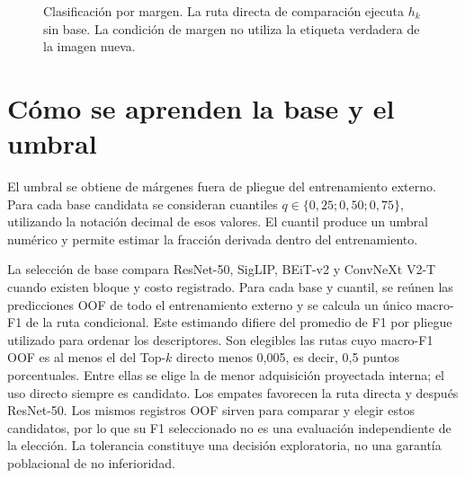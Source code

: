 \begin{figure}[!htbp]\centering
{}
\caption{Clasificación por margen. La ruta directa de comparación ejecuta \(h_k\) sin base. La condición de margen no utiliza la etiqueta verdadera de la imagen nueva.}
\label{fig:tk-inference}
\end{figure}

\section{Cómo se aprenden la base y el umbral}
El umbral se obtiene de márgenes fuera de pliegue del entrenamiento externo. Para cada base candidata se consideran cuantiles \(q\in\{0,25;0,50;0,75\}\), utilizando la notación decimal de esos valores. El cuantil produce un umbral numérico y permite estimar la fracción derivada dentro del entrenamiento.

La selección de base compara ResNet-50, SigLIP, BEiT-v2 y ConvNeXt V2-T cuando existen bloque y costo registrado. Para cada base y cuantil, se reúnen las predicciones OOF de todo el entrenamiento externo y se calcula un único macro-F1 de la ruta condicional. Este estimando difiere del promedio de F1 por pliegue utilizado para ordenar los descriptores. Son elegibles las rutas cuyo macro-F1 OOF es al menos el del Top-\(k\) directo menos 0,005, es decir, 0,5 puntos porcentuales. Entre ellas se elige la de menor adquisición proyectada interna; el uso directo siempre es candidato. Los empates favorecen la ruta directa y después ResNet-50. Los mismos registros OOF sirven para comparar y elegir estos candidatos, por lo que su F1 seleccionado no es una evaluación independiente de la elección. La tolerancia constituye una decisión exploratoria, no una garantía poblacional de no inferioridad.

